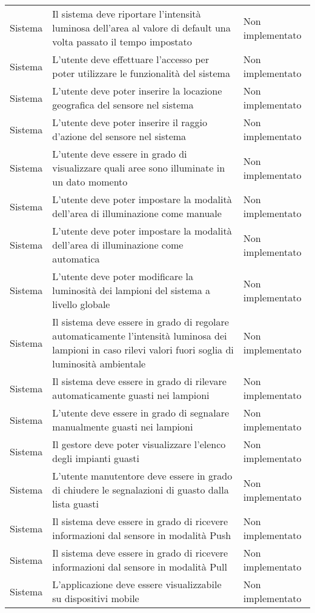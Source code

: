 \begin{center}
\begin{xltabular}{\linewidth}{|l|X|l|}
        Sistema & Il sistema deve riportare l'intensità luminosa dell'area al valore di default una volta passato il tempo impostato & Non implementato\\
        Sistema & L'utente deve effettuare l'accesso per poter utilizzare le funzionalità del sistema & Non implementato\\
        Sistema & L'utente deve poter inserire la locazione geografica del sensore nel sistema & Non implementato\\
        Sistema & L'utente deve poter inserire il raggio d'azione del sensore nel sistema & Non implementato\\
        Sistema & L'utente deve essere in grado di visualizzare quali aree sono illuminate in un dato momento & Non implementato\\
        Sistema & L'utente deve poter impostare la modalità dell'area di illuminazione come manuale & Non implementato\\
        Sistema & L'utente deve poter impostare la modalità dell'area di illuminazione come automatica & Non implementato\\
        Sistema & L'utente deve poter modificare la luminosità dei lampioni del sistema a livello globale & Non implementato\\
        Sistema & Il sistema deve essere in grado di regolare automaticamente l'intensità luminosa dei lampioni in caso rilevi valori fuori soglia di luminosità ambientale & Non implementato\\
        Sistema & Il sistema deve essere in grado di rilevare automaticamente guasti nei lampioni & Non implementato\\
        Sistema & L'utente deve essere in grado di segnalare manualmente guasti nei lampioni & Non implementato\\
        Sistema & Il gestore deve poter visualizzare l'elenco degli impianti guasti & Non implementato\\
        Sistema & L'utente manutentore deve essere in grado di chiudere le segnalazioni di guasto dalla lista guasti & Non implementato\\
        Sistema & Il sistema deve essere in grado di ricevere informazioni dal sensore in modalità Push & Non implementato\\
        Sistema & Il sistema deve essere in grado di ricevere informazioni dal sensore in modalità Pull & Non implementato\\
        Sistema & L'applicazione deve essere visualizzabile su dispositivi mobile & Non implementato\\

\end{xltabular}
\end{center}
